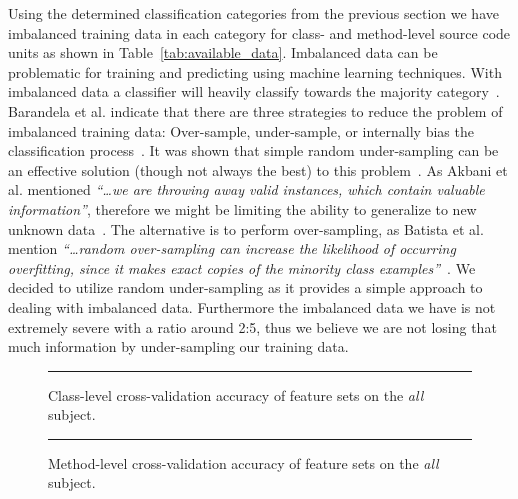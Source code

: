 Using the determined classification categories from the previous section we have imbalanced training data in each category for class- and method-level source code units as shown in Table~\ref{tab:available_data}. Imbalanced data can be problematic for training and predicting using machine learning techniques. With imbalanced data a classifier will heavily classify towards the majority category~\cite{BOSB10}. Barandela et al. indicate that there are three strategies to reduce the problem of imbalanced training data: Over-sample, under-sample, or internally bias the classification process~\cite{BVSF04}. It was shown that simple random under-sampling can be an effective solution (though not always the best) to this problem~\cite{Jap00,AKJ04}. As Akbani et al. mentioned \emph{``\ldots we are throwing away valid instances, which contain valuable information''}, therefore we might be limiting the ability to generalize to new unknown data~\cite{AKJ04}. The alternative is to perform over-sampling, as Batista et al. mention \emph{``\ldots random over-sampling can increase the likelihood of occurring overﬁtting, since it makes exact copies of the minority class examples''}~\cite{BPM04}. We decided to utilize random under-sampling as it provides a simple approach to dealing with imbalanced data. Furthermore the imbalanced data we have is not extremely severe with a ratio around 2:5, thus we believe we are not losing that much information by under-sampling our training data.

\begin{figure}[ht!]
  \centering
  \begin{adjustbox}{max size={.95\textwidth}{.95\textheight}}
    
  \end{adjustbox}
  \caption{Class-level cross-validation accuracy of feature sets on the \emph{all} subject.}
  \vspace{2mm}
  \hrule
  \label{fig:all_cross_validation_features_class_graph}
\end{figure}

\begin{figure}[ht!]
  \centering
  \begin{adjustbox}{max size={.95\textwidth}{.95\textheight}}
    
  \end{adjustbox}
  \caption{Method-level cross-validation accuracy of feature sets on the \emph{all} subject.}
  \vspace{2mm}
  \hrule
  \label{fig:all_cross_validation_features_method_graph}
\end{figure}


